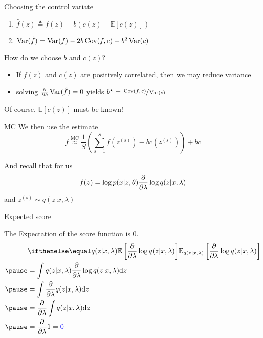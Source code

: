 \begin{frame}{Choosing the control variate}

\begin{enumerate}
	\item $\hat f(z) \triangleq f(z) - b(c(z) - \mathbb E[c(z)])$ 
	\item $\operatorname{Var}(\hat f) = \operatorname{Var}(f) - 2b \operatorname{Cov}(f, c) + b^2 \operatorname{Var}(c)$ 
\end{enumerate}

How do we choose $b$ and $c(z)$? \pause
\begin{itemize}
	\item If $f(z)$ and $c(z)$ are positively correlated, then we may reduce variance \pause
	\item solving $\pdv{b}\operatorname{Var}(\hat f) = 0$ \pause yields $b^\star = \sfrac{\operatorname{Cov}(f,c)}{\operatorname{Var}(c)}$
\end{itemize}

\pause

Of course, $\mathbb E[c(z)]$ must be known!

\end{frame}

\begin{frame}{MC}
We then use the estimate
\begin{equation*}
\bar f \overset{\text{MC}}{\approx} \frac{1}{S} \left( \sum_{s=1}^S f(z^{(s)}) - b c(z^{(s)})\right) + b \bar c
\end{equation*}
\pause

And recall that for us 
\begin{equation*}
f(z) = \log p(x|z, \theta) \pdv{\lambda} \log q(z|x, \lambda)
\end{equation*}
and $z^{(s)} \sim q(z|x, \lambda)$
\end{frame}


\begin{frame}{Expected score}

The Expectation of the score function is 0. 
\begin{equation*}
\begin{aligned}
&\E[q(z|x,\lambda)]{\pdv{\lambda} \log q(z|x,\lambda)} \\ \pause
&= \int q(z|x, \lambda) \pdv{\lambda} \log q(z|x, \lambda) \dd z\\ \pause
&= \int  \pdv{\lambda} q(z|x, \lambda) \dd z \\ \pause
&= \pdv{\lambda} \int q(z|x, \lambda) \dd z \\ \pause
&= \pdv{\lambda} 1 = \textcolor{blue}{0} 
\end{aligned}
\end{equation*}

\end{frame}

